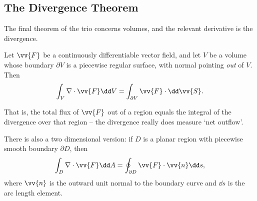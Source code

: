 \subsection{The Divergence Theorem}

The final theorem of the trio concerns volumes, and the relevant derivative is the divergence.

\begin{theorem}
	Let $\vv{F}$ be a continuously differentiable vector field, and let $V$ be a volume whose boundary $\partial V$ is a piecewise regular surface, with normal pointing \emph{out} of $V$. Then
	$$
	\int_V \nabla \cdot \vv{F} \dd V = \int_{\partial V} \vv{F} \cdot \dd \vv{S}.
	$$
\end{theorem}

That is, the total flux of $\vv{F}$ out of a region equals the integral of the divergence over that region -- the divergence really does measure `net outflow'.

\begin{center}
\end{center}

There is also a two dimensional version: if $D$ is a planar region with piecewise smooth boundary $\partial D$, then
$$
\int_D \nabla \cdot \vv{F} \dd A = \oint_{\partial D} \vv{F} \cdot \vv{n} \dd s,
$$
where $\vv{n}$ is the outward unit normal to the boundary curve and $\dd s$ is the arc length element.


